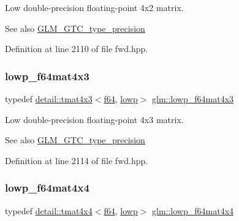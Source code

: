 Low double-\/precision floating-\/point 4x2 matrix. \begin{DoxySeeAlso}{See also}
\hyperlink{group__gtc__type__precision}{G\+L\+M\+\_\+\+G\+T\+C\+\_\+type\+\_\+precision} 
\end{DoxySeeAlso}


Definition at line 2110 of file fwd.\+hpp.

\mbox{\label{group__gtc__type__precision_ga05dba0f9d45301c7b10a9276c60b8a0e}} 
\subsubsection{\texorpdfstring{lowp\+\_\+f64mat4x3}{lowp\_f64mat4x3}}
{\footnotesize\ttfamily typedef \hyperlink{structglm_1_1detail_1_1tmat4x3}{detail\+::tmat4x3}$<$\hyperlink{group__gtc__type__precision_ga2bba392e555124b36cde6abba349bab3}{f64}, \hyperlink{namespaceglm_a0f04f086094c747d227af4425893f545ae161af3fc695e696ce3bf69f7332bc2d}{lowp}$>$ \hyperlink{group__gtc__type__precision_ga05dba0f9d45301c7b10a9276c60b8a0e}{glm\+::lowp\+\_\+f64mat4x3}}

Low double-\/precision floating-\/point 4x3 matrix. \begin{DoxySeeAlso}{See also}
\hyperlink{group__gtc__type__precision}{G\+L\+M\+\_\+\+G\+T\+C\+\_\+type\+\_\+precision} 
\end{DoxySeeAlso}


Definition at line 2114 of file fwd.\+hpp.

\mbox{\label{group__gtc__type__precision_gab7d0922ed8d93ee3ce995858feb41231}} 
\subsubsection{\texorpdfstring{lowp\+\_\+f64mat4x4}{lowp\_f64mat4x4}}
{\footnotesize\ttfamily typedef \hyperlink{structglm_1_1detail_1_1tmat4x4}{detail\+::tmat4x4}$<$\hyperlink{group__gtc__type__precision_ga2bba392e555124b36cde6abba349bab3}{f64}, \hyperlink{namespaceglm_a0f04f086094c747d227af4425893f545ae161af3fc695e696ce3bf69f7332bc2d}{lowp}$>$ \hyperlink{group__gtc__type__precision_gab7d0922ed8d93ee3ce995858feb41231}{glm\+::lowp\+\_\+f64mat4x4}}

